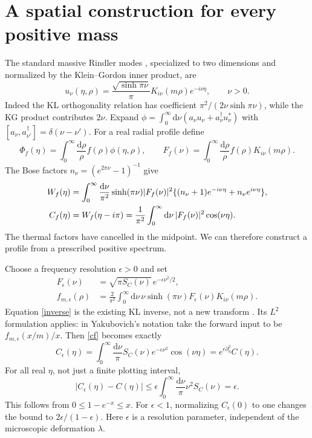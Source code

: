 \documentclass[11pt,a4paper]{article}
\newcommand{\dd}{\mathrm d}
\begin{document}
\section{A spatial construction for every positive mass}
The standard massive Rindler modes \cite{unruh}, specialized to two
dimensions and normalized by the Klein--Gordon inner product, are
\begin{equation}
 u_\nu(\eta,\rho)=\frac{\sqrt{\sinh\pi\nu}}{\pi}
 K_{i\nu}(m\rho)e^{-i\nu\eta},\qquad \nu>0.\label{modes}
\end{equation}
Indeed the KL orthogonality relation has coefficient
$\pi^2/(2\nu\sinh\pi\nu)$, while the KG product contributes $2\nu$.
Expand $\phi=\int_0^\infty\dd\nu(a_\nu u_\nu+a_\nu^\dagger u_\nu^*)$
with $[a_\nu,a_{\nu'}^\dagger]=\delta(\nu-\nu')$.
For a real radial profile define
\begin{equation}
 \Phi_f(\eta)=\int_0^\infty\frac{\dd\rho}{\rho}f(\rho)\phi(\eta,\rho),
 \qquad F_f(\nu)=\int_0^\infty\frac{\dd\rho}{\rho}f(\rho)K_{i\nu}(m\rho).
\end{equation}
The Bose factors $n_\nu=(e^{2\pi\nu}-1)^{-1}$ give
\begin{align}
 W_f(\eta)&=\int_0^\infty\frac{\dd\nu}{\pi^2}\sinh(\pi\nu)|F_f(\nu)|^2
 \{(n_\nu+1)e^{-i\nu\eta}+n_\nu e^{i\nu\eta}\},\notag\\
 C_f(\eta)&=W_f(\eta-i\pi)
 =\frac1{\pi^2}\int_0^\infty\dd\nu\,|F_f(\nu)|^2\cos(\nu\eta).\label{cf}
\end{align}
The thermal factors have cancelled in the midpoint. We can therefore
construct a profile from a prescribed positive spectrum.

Choose a frequency resolution $\epsilon>0$ and set
\begin{align}
 F_\epsilon(\nu)&=\sqrt{\pi S_C(\nu)}\,e^{-\epsilon\nu^2/2},\label{fe}\\
 f_{m,\epsilon}(\rho)&=\frac2{\pi^2}\int_0^\infty\dd\nu\,
 \nu\sinh(\pi\nu)F_\epsilon(\nu)K_{i\nu}(m\rho).\label{inverse}
\end{align}
Equation \eqref{inverse} is the existing KL inverse, not a new transform
\cite{dlmf,yak}. Its $L^2$ formulation applies: in Yakubovich's
notation take the forward input to be $f_{m,\epsilon}(x/m)/x$.
Then \eqref{cf} becomes exactly
\begin{equation}
 C_\epsilon(\eta)=\int_0^\infty\frac{\dd\nu}{\pi}
 S_C(\nu)e^{-\epsilon\nu^2}\cos(\nu\eta)
 =e^{\epsilon\partial_\eta^2}C(\eta).\label{heat}
\end{equation}
For all real $\eta$, not just a finite plotting interval,
\begin{equation}
 |C_\epsilon(\eta)-C(\eta)|\leq
 \epsilon\int_0^\infty\frac{\dd\nu}{\pi}\nu^2S_C(\nu)=\epsilon.\label{bound}
\end{equation}
This follows from $0\leq1-e^{-x}\leq x$. For $\epsilon<1$,
normalizing $C_\epsilon(0)$ to one changes the bound to
$2\epsilon/(1-\epsilon)$. Here $\epsilon$ is a resolution parameter,
independent of the microscopic deformation $\lambda$.
\end{document}
